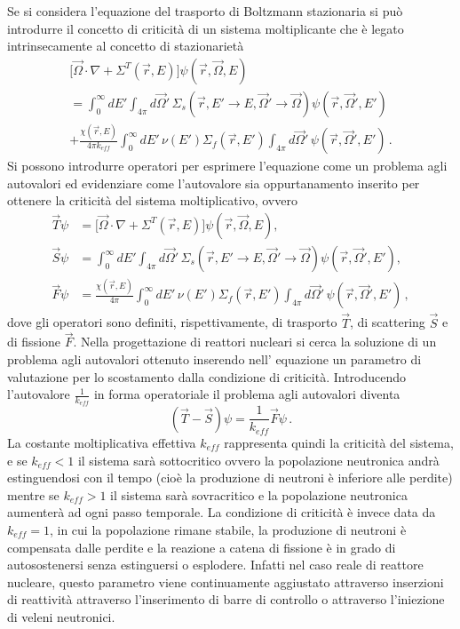 Se si considera l'equazione del trasporto di Boltzmann stazionaria si può 
introdurre il concetto di criticità di un sistema moltiplicante che è legato 
intrinsecamente al concetto di stazionarietà
\begin{multline}
\label{eq_boltzmann_staz_estesa}
\biggl[\vec{\Omega} \cdot \nabla + \Sigma^T(\vec{r},E)
\biggr] \psi(\vec{r},\vec{\Omega},E) \\
= \int_{0}^{\infty} dE' \int_{4\pi} 
d\vec{\Omega}'\,\Sigma_s(\vec{r},{E'\rightarrow E},
{\vec{\Omega}'\rightarrow\vec{\Omega}}) 
\psi(\vec{r},\vec{\Omega}',E') \\
+ \frac{\chi(\vec{r},E)}{4\pi
k_{eff}} \int_{0}^{\infty} dE'\,
\nu(E')\Sigma_f(\vec{r},E') \int_{4\pi} d\vec{\Omega}'\,
\psi(\vec{r},\vec{\Omega}',E') \,.
\end{multline}
Si possono introdurre operatori per esprimere l'equazione come un problema agli autovalori ed
evidenziare come l'autovalore sia
oppurtanamento inserito per ottenere la criticità del sistema moltiplicativo, 
ovvero
\begin{equation}
\begin{split}
\vec{T}\psi & = \biggl[\vec{\Omega} \cdot \nabla + \Sigma^T(\vec{r},E)
\biggr] \psi(\vec{r},\vec{\Omega},E), \\
\vec{S}\psi &= \int_{0}^{\infty} dE' \int_{4\pi} 
d\vec{\Omega}'\,\Sigma_s(\vec{r},{E'\rightarrow E},
{\vec{\Omega}'\rightarrow\vec{\Omega}}) 
\psi(\vec{r},\vec{\Omega}',E'),\\
\vec{F}\psi &= \frac{\chi(\vec{r},E)}{4\pi} \int_{0}^{\infty} dE'\,
\nu(E')\Sigma_f(\vec{r},E') \int_{4\pi} d\vec{\Omega}'\,
\psi(\vec{r},\vec{\Omega}',E') \,,
\end{split}
\end{equation}
dove gli operatori sono definiti, rispettivamente, di trasporto $\vec{T}$, di 
scattering $\vec{S}$ e di fissione $\vec{F}$. Nella progettazione di reattori 
nucleari si cerca la soluzione di un problema agli autovalori ottenuto inserendo 
nell’ equazione un parametro di valutazione per lo scostamento dalla condizione 
di criticità.
Introducendo l'autovalore $\frac{1}{k_{eff}}$ in forma operatoriale il problema agli autovalori diventa
\begin{equation}
(\vec{T}-\vec{S})\psi = \frac{1}{k_{eff}} \vec{F}\psi \,.
\end{equation}
La costante moltiplicativa effettiva $k_{eff}$ rappresenta quindi la criticità 
del sistema, e se $k_{eff}<1$ il sistema sarà sottocritico ovvero la 
popolazione neutronica andrà estinguendosi con il tempo (cioè la produzione 
di neutroni è inferiore alle perdite) mentre se $k_{eff}>1$ il sistema sarà 
sovracritico e la popolazione neutronica aumenterà ad ogni passo temporale.
La condizione di criticità è invece data da $k_{eff}=1$, in cui la popolazione 
rimane stabile, la produzione di neutroni è compensata dalle perdite e 
la reazione a catena di fissione è in grado di autosostenersi senza estinguersi 
o esplodere.
Infatti nel caso reale di reattore nucleare, questo parametro viene 
continuamente aggiustato attraverso inserzioni di reattività attraverso 
l'inserimento di barre di controllo o attraverso l'iniezione di veleni 
neutronici.


